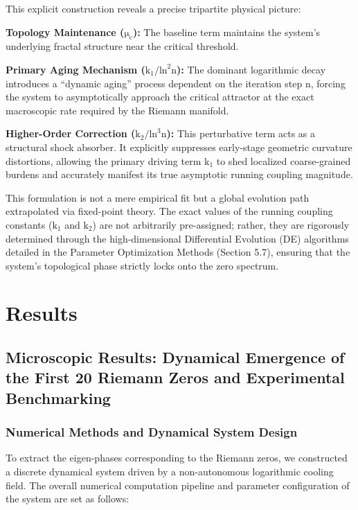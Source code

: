 This explicit construction reveals a precise tripartite physical
picture:

\textbf{Topology Maintenance (}\(\text{μ}_{\text{c}}\)\textbf{):} The
baseline term maintains the system's underlying fractal structure near
the critical threshold.

\textbf{Primary Aging Mechanism
(}\(\text{k}_{\text{1}}\text{/}\text{ln}^{\text{2}}\text{n}\)\textbf{):}
The dominant logarithmic decay introduces a ``dynamic aging'' process
dependent on the iteration step \(\text{n}\), forcing the system to
asymptotically approach the critical attractor at the exact macroscopic
rate required by the Riemann manifold.

\textbf{Higher-Order Correction
(}\(\text{k}_{\text{2}}\text{/}\text{ln}^{\text{3}}\text{n}\)\textbf{):}
This perturbative term acts as a structural shock absorber. It
explicitly suppresses early-stage geometric curvature distortions,
allowing the primary driving term \(\text{k}_{\text{1}}\) to shed
localized coarse-grained burdens and accurately manifest its true
asymptotic running coupling magnitude.

This formulation is not a mere empirical fit but a global evolution path
extrapolated via fixed-point theory. The exact values of the running
coupling constants (\(\text{k}_{\text{1}}\) and \(\text{k}_{\text{2}}\))
are not arbitrarily pre-assigned; rather, they are rigorously determined
through the high-dimensional Differential Evolution (DE) algorithms
detailed in the Parameter Optimization Methods (Section 5.7), ensuring
that the system's topological phase strictly locks onto the zero
spectrum.

\section*{Results}

\subsection*{Microscopic Results: Dynamical Emergence of the First 20 Riemann Zeros and Experimental Benchmarking}

\subsubsection*{Numerical Methods and Dynamical System Design}

To extract the eigen-phases corresponding to the Riemann zeros, we
constructed a discrete dynamical system driven by a non-autonomous
logarithmic cooling field. The overall numerical computation pipeline
and parameter configuration of the system are set as follows:

